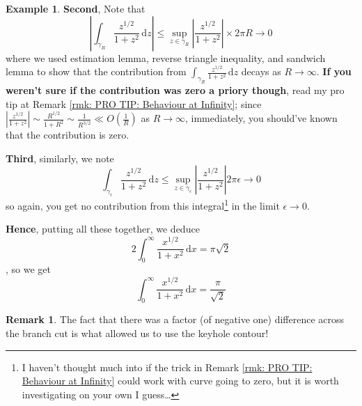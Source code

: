 \documentclass[a4paper, 12pt]{article}
\theoremstyle{definition}
\newtheorem{example}{Example}
\newtheorem{remark}{Remark}
\numberwithin{theorem}{section}
\numberwithin{definition}{section}
\numberwithin{exercise}{section}
\numberwithin{remark}{section}
\numberwithin{figure}{section}
\numberwithin{example}{section}
\newcommand{\intd}{\,\text{d}}
\begin{document}
\begin{example}
    \textbf{Second},
    Note that
    \begin{equation*}
        \left| \int_{\gamma_R} \frac{z^{1/2}}{1+z^2} \intd z \right|
        \leq
        \sup_{z \in \gamma_R} \left|\frac{z^{1/2}}{1 + z^2} \right| \times 2 \pi R
        \rightarrow 0
    \end{equation*}
    where we used estimation lemma, reverse triangle inequality, and sandwich lemma to show that
    the contribution from $\int_{\gamma_R} \frac{z^{1/2}}{1+z^2} \intd z$ decays as $R \rightarrow \infty$.
    \textbf{If you weren't sure if the contribution was zero a priory though},
    read my pro tip at Remark \ref{rmk: PRO TIP: Behaviour at Infinity};
    since $\left|\frac{z^{1/2}}{1 + z^2}\right| \sim \frac{R^{1/2}}{1+R^2} \sim \frac{1}{R^{3/2}} \ll O\left( \frac{1}{R} \right)$ as $R \rightarrow \infty$,
    immediately, you should've known that the contribution is zero.

    \textbf{Third},
    similarly, we note
    \begin{equation*}
        \int_{\gamma_\epsilon} \frac{z^{1/2}}{1+z^2} \intd z
        \leq
        \sup_{z \in \gamma_\epsilon} \left|\frac{z^{1/2}}{1+z^2} \right| 2 \pi \epsilon
        \rightarrow 0
    \end{equation*}
    so again, you get no contribution from this integral\footnote{I haven't thought much into if the trick in Remark \ref{rmk: PRO TIP: Behaviour at Infinity} could work with curve going to zero, but it is worth investigating on your own I guess\dots} in the limit $\epsilon \rightarrow 0$.

    \textbf{Hence},
    putting all these together,
    we deduce
    \begin{equation*}
        2 \int_{0}^{\infty} \frac{x^{1/2}}{1 + x^2} \intd x = \pi \sqrt{2}
    \end{equation*},
    so we get
    \begin{equation*}
        \int_{0}^{\infty}\frac{x^{1/2}}{1 + x^2} \intd x =\frac{\pi}{\sqrt{2}}
    \end{equation*}
\end{example}
\begin{remark}
    The fact that there was a factor (of negative one) difference across the branch cut is what allowed us to use the keyhole contour!
\end{remark}
\end{document}
